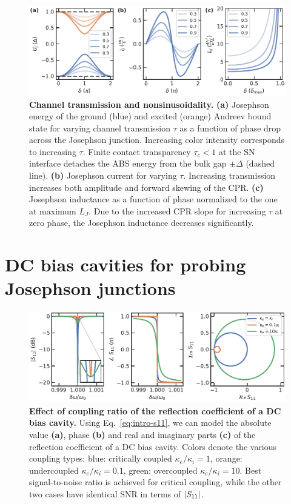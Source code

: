 \begin{figure}[t]
	\centering
	\includegraphics[width=\linewidth]{chapter-introduction/figs/model_SNS_EjIc}
	\caption{
		\textbf{Channel transmission and nonsinusoidality.}
		\textbf{(a)} Josephson energy of the ground (blue) and excited (orange) Andreev bound state for varying channel transmission $\tau$ as a function of phase drop across the Josephson junction.
		Increasing color intensity corresponds to increasing $\tau$.
		Finite contact transparency $\tau_c<1$ at the SN interface detaches the ABS energy from the bulk gap $\pm\Delta$ (dashed line).
		\textbf{(b)} Josephson current for varying $\tau$.
		Increasing transmission increases both amplitude and forward skewing of the CPR.
		\textbf{(c)} Josephson inductance as a function of phase normalized to the one at maximum $L_J$.
		Due to the increased CPR slope for increasing $\tau$ at zero phase, the Josephson inductance decreases significantly.
	}
	\label{fig:modelsnsejic}
\end{figure}


\section{DC bias cavities for probing Josephson junctions}

\begin{figure}[t]
	\centering
	\includegraphics[width=\linewidth]{chapter-introduction/figs/model_DC_bias_cavity_coupling.pdf}
	\caption{
		\textbf{Effect of coupling ratio of the reflection coefficient of a DC bias cavity.}
		Using Eq.~\ref{eq:intro-s11}, we can model the absolute value \textbf{(a)}, phase \textbf{(b)} and real and imaginary parts \textbf{(c)} of the reflection coefficient of a DC bias cavity.
		Colors denote the various coupling types: blue: critically coupled $\kappa_e/\kappa_i=1$, orange: undercoupled $\kappa_e/\kappa_i=0.1$, green: overcoupled $\kappa_e/\kappa_i=10$.
		Best signal-to-noise ratio is achieved for critical coupling, while the other two cases have identical SNR in terms of $\lvert S_{11}\rvert$.
	}
	\label{fig:s11}
\end{figure}


